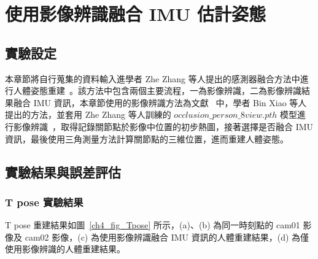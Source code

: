 \section{使用影像辨識融合 IMU 估計姿態}
\subsection{實驗設定}
本章節將自行蒐集的資料輸入進學者 Zhe Zhang 等人提出的感測器融合方法中進行人體姿態重建~\cite{Zhang_2020_CVPR}。該方法中包含兩個主要流程，一為影像辨識，二為影像辨識結果融合 IMU 資訊，本章節使用的影像辨識方法為文獻~\cite{Xiao_2018_ECCV} 中，學者 Bin Xiao 等人提出的方法，並套用 Zhe Zhang 等人訓練的 $occlusion\_person\_8view.pth$ 模型進行影像辨識~\cite{zhang2020adafuse}，取得記錄關節點於影像中位置的初步熱圖，接著選擇是否融合 IMU 資訊，最後使用三角測量方法計算關節點的三維位置，進而重建人體姿態。


\subsection{實驗結果與誤差評估}
\subsubsection*{T pose 實驗結果}
T pose 重建結果如圖~\ref{ch4_fig_Tpose} 所示，(a)、(b) 為同一時刻點的 cam01 影像及 cam02 影像，(c) 為使用影像辨識融合 IMU 資訊的人體重建結果，(d) 為僅使用影像辨識的人體重建結果。

